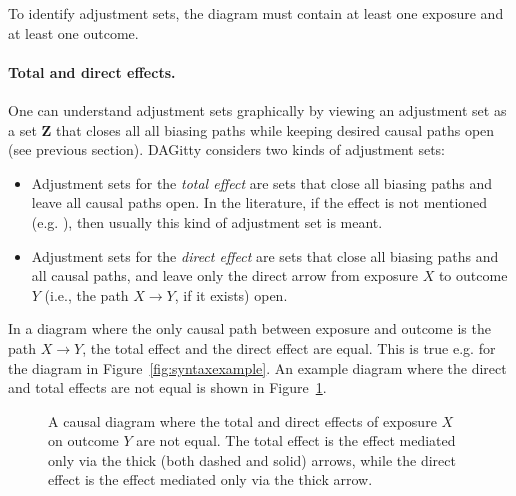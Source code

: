 \documentclass[a4paper,10pt]{article}
\newcommand{\pname}{{\sc DAG}itty\xspace}
\begin{document}
To identify adjustment sets, the diagram must contain at least
one exposure and at least one outcome.

\paragraph{Total and direct effects.}
One can understand adjustment sets graphically by viewing an adjustment set
as a set $\mathbf{Z}$ that closes all all biasing 
paths while keeping desired causal paths open
(see previous section).
\pname considers two kinds of adjustment sets: 

\begin{itemize}
 \item Adjustment sets for the \emph{total effect} are sets that 
close all biasing paths and leave all causal paths
open. 
 In the literature, if the effect is not mentioned
(e.g. \cite{ShrierP2008,KnueppelS2010}), then usually
this kind of adjustment set is meant.
 \item   Adjustment sets for the \emph{direct effect} are sets that 
close all biasing paths and all causal paths, and leave only 
the direct arrow from exposure $X$ to outcome $Y$ (i.e., the path
$X \rightarrow Y$, if it exists) open.
\end{itemize}

In a diagram where the only causal path between exposure 
and outcome is the path $X \rightarrow Y$, the total effect
and the direct effect are equal. This is true e.g. for the 
diagram in Figure~\ref{fig:syntaxexample}. An example diagram where the 
direct and total effects are not equal is shown in 
Figure~\ref{fig:effects}.

\begin{figure}
\begin{center}
\end{center}

\caption{A causal diagram where the total and direct 
effects of exposure $X$ on outcome $Y$ are not equal. The total effect is the effect
mediated only via the thick (both dashed and solid) arrows,
while the direct effect is the effect mediated only 
via the thick arrow.}
\label{fig:effects}

\end{figure}
\end{document}
